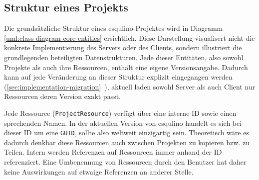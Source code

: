 \subsection{Struktur eines Projekts}

Die grundsätzliche Struktur eines esqulino-Projektes wird in Diagramm \ref{uml:class-diagram-core-entities} ersichtlich. Diese Darstellung visualisert nicht die konkrete Implementierung des Servers oder des Clients, sondern illustriert die grundlegenden beteiligten Datenstrukturen. Jede dieser Entitäten, also sowohl Projekte als auch ihre Ressourcen, enthält eine eigene Versionsangabe. Dadurch kann auf jede Veränderung an dieser Struktur explizit eingegangen werden (\ref{sec:implementation-migration}~), aktuell laden sowohl Server als auch Client nur Ressourcen deren Version exakt passt.

Jede Ressource (\lstinline{ProjectResource}) verfügt über eine interne ID sowie einen sprechenden Namen. In der aktuellen Version von esqulino handelt es sich bei dieser ID um eine \lstinline{GUID}, sollte also weltweit einzigartig sein. Theoretisch wäre es dadurch denkbar diese Ressourcen auch zwischen Projekten zu kopieren bzw. zu Teilen. Intern werden Referenzen auf Ressourcen immer anhand der ID referenziert. Eine Umbenennung von Ressourcen durch den Benutzer hat daher keine Auswirkungen auf etwaige Referenzen an anderer Stelle.


